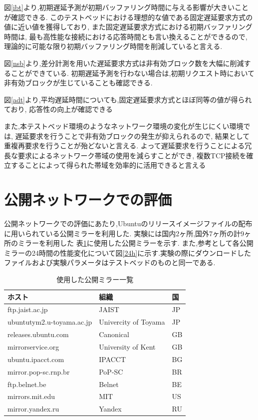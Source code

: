 \documentclass[a4j,12pt]{gradthesis_utf8}
\begin{document}
\clearpage

図\ref{ibt}より,初期遅延予測が初期バッファリング時間に与える影響が大きいことが確認できる.
このテストベッドにおける理想的な値である固定遅延要求方式の値に近い値を獲得しており,
また固定遅延要求方式における初期バッファリング時間は,
最も高性能な接続における応答時間とも言い換えることができるので,
理論的に可能な限り初期バッファリング時間を削減していると言える.

図\ref{nsb}より,差分計測を用いた遅延要求方式は非有効ブロック数を大幅に削減することができている.
初期遅延予測を行わない場合は,初期リクエスト時において非有効ブロックが生じていることも確認できる.

図\ref{adt}より,平均遅延時間についても,固定遅延要求方式とほぼ同等の値が得られており,
応答性の向上が確認できる

また,本テストベッド環境のようなネットワーク環境の変化が生じにくい環境では,
遅延要求を行うことで非有効ブロックの発生が抑えられるので,
結果として重複再要求を行うことが殆どないと言える.
よって遅延要求を行うことによる冗長な要求によるネットワーク帯域の使用を減らすことができ,
複数TCP接続を確立することによって得られた帯域を効率的に活用できると言える

\clearpage

\section{公開ネットワークでの評価}
\label{pub}
公開ネットワークでの評価にあたり,Ubuntuのリリースイメージファイルの配布に用いられている公開ミラー\cite{ubuntu}を利用した.
実験には国内2ヶ所,国外7ヶ所の計9ヶ所のミラーを利用した
表\ref{tablemirror}に使用した公開ミラーを示す.
また,参考として各公開ミラーの24時間の性能変化について図\ref{24h}に示す.実験の際にダウンロードしたファイルおよび実験パラメータはテストベッドのものと同一である.
\begin{table}[h]
	\begin{center}
		\caption{使用した公開ミラー一覧}
		\label{tablemirror}
		\begin{tabular}{|l|l|l|} \hline
			ホスト & 組織 & 国\\ \hline \hline
			ftp.jaist.ac.jp & JAIST & JP \\
			ubuntutym2.u-toyama.ac.jp & Univercity of Toyama & JP \\
			releases.ubuntu.com & Canonical & GB \\
			mirrorservice.org & University of Kent & GB \\
			ubuntu.ipacct.com & IPACCT & BG \\
			mirror.pop-sc.rnp.br & PoP-SC & BR \\
			ftp.belnet.be & Belnet & BE \\
			mirrors.mit.edu & MIT & US \\
			mirror.yandex.ru & Yandex & RU \\ \hline
		\end{tabular}
	\end{center}
\end{table}
\end{document}
